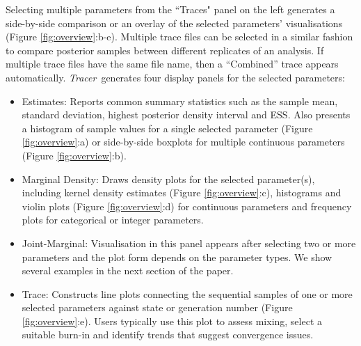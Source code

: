 \documentclass{bioinfo_tracer}
\newcommand{\tracer}{\emph{Tracer}}
\begin{document}

Selecting multiple parameters from the ``Traces" panel on the left generates a side-by-side comparison or an overlay of the selected parameters' visualisations (Figure \ref{fig:overview}:b-e).
Multiple trace files can be selected in a similar fashion to compare posterior samples between different replicates of an analysis.
If multiple trace files have the same file name,  then a ``Combined'' trace appears automatically.
\tracer\ generates four display panels for the selected parameters:


\begin{itemize}

\item Estimates: Reports common summary statistics such as the sample mean, standard deviation, highest posterior density interval and ESS.  Also presents a histogram of sample values for a single selected parameter (Figure \ref{fig:overview}:a) or  side-by-side boxplots for multiple continuous parameters (Figure \ref{fig:overview}:b).

\item Marginal Density: Draws density plots for the selected parameter(s), including  kernel density estimates (Figure \ref{fig:overview}:c), histograms and violin plots (Figure \ref{fig:overview}:d) for continuous parameters and frequency plots for categorical or integer parameters.

\item Joint-Marginal: Visualisation in this panel appears after selecting two or more parameters and the plot form depends on the parameter types. We show several examples in the next section of the paper.

\item Trace: Constructs line plots connecting the sequential samples of one or more selected parameters against state or generation number (Figure \ref{fig:overview}:e).  Users typically use this plot to assess mixing, select a suitable burn-in and identify trends that suggest convergence issues.
\end{itemize}
%
\end{document}
